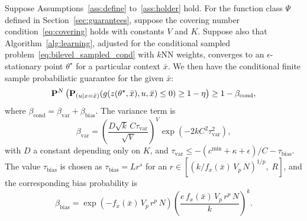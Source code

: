 \begin{theorem}
	\label{thm:fin_sample_cond}
Suppose Assumptions~\ref{ass:define} to~\ref{ass:holder} hold.
For the function class $\Psi$ defined in Section~\ref{sec:guarantees}, suppose the covering number condition~\eqref{eq:covering} holds with constants $V$ and $K$.
Suppose also that Algorithm~\ref{alg:learning}, adjusted for the conditional sampled problem~\eqref{eq:bilevel_sampled_cond} with $k$NN weights, converges to an $\epsilon$-stationary point $\theta^\star$ for a particular context $\bar{x}$. We then have the conditional finite sample probabilistic guarantee for the given $\bar{x}$:
\begin{equation}
	\label{eq:prob_guarantee_cond}
	{\mathbf P}^{N}\left ({\mathbf P}_{(u | x = \bar{x})}(g(z(\theta^\star,\bar{x}),u,\bar{x})\leq 0) \geq 1 - \eta \right ) \geq 1 - \beta_{\mathrm{cond}},
\end{equation}
where $\beta_{\mathrm{cond}} = \beta_{\mathrm{var}} + \beta_{\mathrm{bias}}$.
The variance term is
$$\beta_{\mathrm{var}} = \left(\frac{D\sqrt{k}\,C\tau_{\mathrm{var}}}{\sqrt{V}}\right)^V\exp(-2kC^2\tau_{\mathrm{var}}^2),$$
with $D$ a constant depending only on $K$, and $\tau_{\mathrm{var}} \leq -(c^{\min}+\kappa+\epsilon)/C - \tau_{\mathrm{bias}} $.
The value $\tau_{\mathrm{bias}}$ is chosen as $\tau_{\mathrm{bias}}= L r^s$ for an $r \in \left[\left({k/f_x(\bar{x})\, V_p\, N}\right)^{1/p},\; R\right]$, and the corresponding bias probability is
$$\beta_{\mathrm{bias}} = \exp\left(-f_x(\bar{x})\, V_p\, r^p\, N\right)\left(\frac{e\,f_x(\bar{x})\, V_p\, r^p\, N}{k}\right)^k.$$
\end{theorem}

